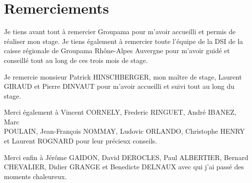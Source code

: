 \chapter*{Remerciements}

Je tiens avant tout à remercier Groupama pour m'avoir accueilli et
permis de réaliser mon stage. Je tiens également à remercier toute
l'équipe de la DSI de la caisse régionale de Groupama Rhône-Alpes
Auvergne pour m'avoir guidé et conseillé tout au long de ces trois
mois de stage.


Je remercie monsieur Patrick HINSCHBERGER, mon maître de stage,
Laurent GIRAUD et Pierre DINVAUT pour m'avoir accueilli et suivi tout
au long du stage.


Merci également à Vincent CORNELY, Frederic RINGUET, André IBANEZ,
Marc \\POULAIN, Jean-François NOMMAY, Ludovic ORLANDO, Christophe HENRY
et Laurent ROGNARD pour leur précieux conseils.


Merci enfin à Jérôme GAIDON, David DEROCLES, Paul ALBERTIER, Bernard\\
CHEVALIER, Didier GRANGE et Benedicte DELNAUX avec qui j'ai passé des moments
chaleureux.

